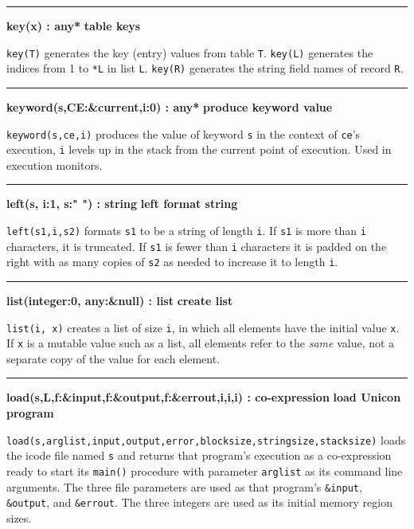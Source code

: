 \bigskip\hrule\vspace{0.1cm}
\noindent
{\bf key(x) : any* } \hfill {\bf table keys}\WarningNotThreadSafe

\noindent
{}\texttt{key(T)} generates the key (entry) values from
table \texttt{T}. \texttt{key(L)} generates the indices from 1 to
\texttt{*L} in list \texttt{L}. \texttt{key(R)} generates the string
field names of record \texttt{R}.

\bigskip\hrule\vspace{0.1cm}
\noindent
{\bf keyword(s,CE:\&current,i:0) : any* } \hfill {\bf produce keyword value}

\noindent
{}\texttt{keyword(s,ce,i)} produces the value of keyword
\texttt{s} in the context of \texttt{ce}'s execution,
\texttt{i} levels up in the stack from the current point of execution.
Used in execution monitors.

\bigskip\hrule\vspace{0.1cm}
\noindent
{\bf left(s, i:1, s:" ") : string } \hfill {\bf left format string}

\noindent
{}\texttt{left(s1,i,s2)} formats \texttt{s1} to be a string
of length \texttt{i}. If \texttt{s1} is more than \texttt{i}
characters, it is truncated. If \texttt{s1} is fewer than \texttt{i}
characters it is padded on the right with as many copies of \texttt{s2}
as needed to increase it to length \texttt{i}.

\bigskip\hrule\vspace{0.1cm}
\noindent
{\bf list(integer:0, any:\&null) : list } \hfill {\bf create list}

\noindent
{}\texttt{list(i, x)} creates a list of size \texttt{i},
in which all elements have the initial value \texttt{x}. If \texttt{x}
is a mutable value such as a list, all elements refer to the
\textit{same} value, not a separate copy of the value for each element.

\bigskip\hrule\vspace{0.1cm}
\noindent
{\bf load(s,L,f:\&input,f:\&output,f:\&errout,i,i,i) : co-expression } \hfill {\bf load Unicon program}

\noindent
{}
\texttt{load(s,arglist,input,output,error,blocksize,stringsize,stacksize)}
loads the icode file named \texttt{s} and returns that
program's execution as a co-expression ready to start
its \texttt{main()} procedure with parameter \texttt{arglist} as its
command line arguments. The three file parameters are used as that
program's \texttt{\&input}, \texttt{\&output}, and
\texttt{\&errout}. The three integers are used as its initial memory
region sizes.

